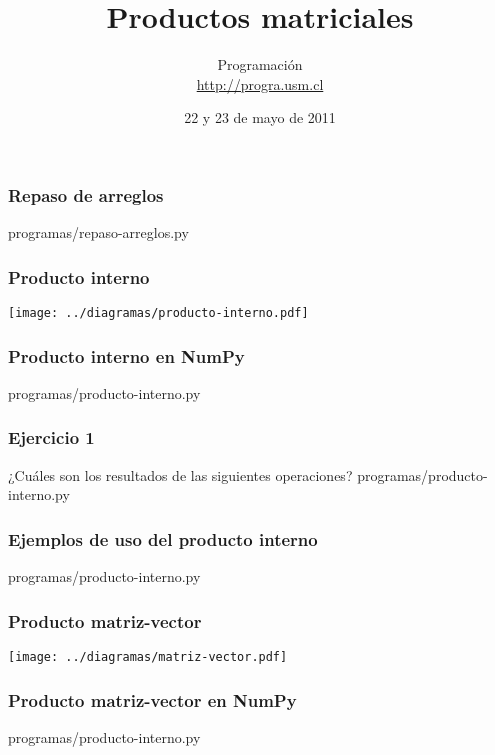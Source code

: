 \documentclass[12pt]{beamer}
\title{Productos matriciales}
\author{
  Programación \\ \url{http://progra.usm.cl}
}
\date{22 y 23 de mayo de 2011}
\begin{document}
  \begin{frame}
    \maketitle
  \end{frame}

  \begin{frame}
    \label{repaso-arreglos}
    \frametitle{Repaso de arreglos}
        {programas/repaso-arreglos.py}
  \end{frame}

  \begin{frame}
    \label{producto-interno}
    \frametitle{Producto interno}
    \texttt{[image: ../diagramas/producto-interno.pdf]}
  \end{frame}

  \begin{frame}
    \label{producto-interno-numpy}
    \frametitle{Producto interno en NumPy}
    
        {programas/producto-interno.py}
  \end{frame}

  \begin{frame}
    \label{ejercicios-producto-interno}
    \frametitle{Ejercicio 1}
    ¿Cuáles son los resultados
    de las siguientes operaciones?
        {programas/producto-interno.py}
  \end{frame}

  \begin{frame}
    \label{ejemplos-producto-interno}
    \frametitle{Ejemplos de uso del producto interno}
        {programas/producto-interno.py}
  \end{frame}

  \begin{frame}
    \label{producto-matriz-vector}
    \frametitle{Producto matriz-vector}
    \texttt{[image: ../diagramas/matriz-vector.pdf]}
  \end{frame}

  \begin{frame}
    \label{producto-matriz-vector-numpy}
    \frametitle{Producto matriz-vector en NumPy}
    
        {programas/producto-interno.py}
  \end{frame}
\end{document}
